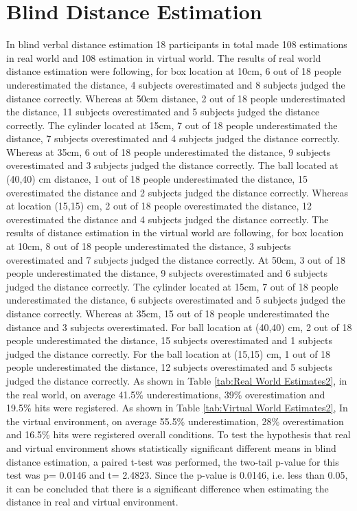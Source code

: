 \section{Blind Distance Estimation}  
In blind verbal distance estimation 18 participants in total made 108 estimations in real world and 108 estimation in virtual world. The results of real world distance estimation were following, for box location at 10cm, 6 out of 18 people underestimated the distance, 4 subjects overestimated and 8 subjects judged the distance correctly. Whereas at 50cm distance, 2 out of 18 people underestimated the distance, 11 subjects overestimated and 5 subjects judged the distance correctly. The cylinder located at 15cm, 7 out of 18 people underestimated the distance, 7 subjects overestimated and 4 subjects judged the distance correctly. Whereas at 35cm, 6 out of 18 people underestimated the distance, 9 subjects overestimated and 3 subjects judged the distance correctly. The ball located at (40,40) cm distance, 1 out of 18 people underestimated the distance, 15 overestimated the distance and 2 subjects judged the distance correctly. Whereas at location (15,15) cm, 2 out of 18 people overestimated the distance, 12 overestimated the distance and 4 subjects judged the distance correctly. 
The results of distance estimation in the virtual world are following, for box location at 10cm, 8 out of 18 people underestimated the distance, 3 subjects overestimated and 7 subjects judged the distance correctly. At 50cm, 3 out of 18 people underestimated the distance, 9 subjects overestimated and 6 subjects judged the distance correctly. The cylinder located at 15cm, 7 out of 18 people underestimated the distance, 6 subjects overestimated and 5 subjects judged the distance correctly. Whereas at 35cm, 15 out of 18 people underestimated the distance and 3 subjects overestimated. For ball location at (40,40) cm, 2 out of 18 people underestimated the distance, 15 subjects overestimated and 1 subjects judged
the distance correctly. For the ball location at (15,15) cm, 1 out of 18 people underestimated the distance, 12 subjects overestimated and 5 subjects judged the distance correctly. As shown in Table \ref{tab:Real World Estimates2}, in the real world, on average 41.5\% underestimations, 39\% overestimation and 19.5\% hits were registered. As shown in Table \ref{tab:Virtual World Estimates2}, In the virtual environment, on average 55.5\% underestimation, 28\% overestimation and 16.5\% hits were registered overall conditions. To test the hypothesis that real and virtual environment shows statistically significant different means in blind distance estimation, a paired t-test was performed, the two-tail p-value for this test was p= 0.0146 and t= 2.4823. Since the p-value is 0.0146, i.e. less than 0.05, it can be concluded that there is a significant difference when estimating the distance in real and virtual environment. 
